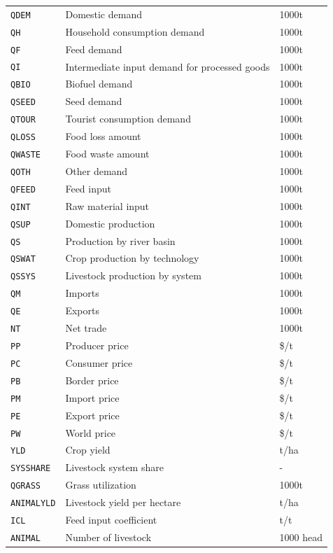 \begin{xltabular}{\linewidth}{l X l}
  \texttt{QDEM} & Domestic demand & 1000t \\
  \texttt{QH} & Household consumption demand & 1000t \\
  \texttt{QF} & Feed demand & 1000t \\
  \texttt{QI} & Intermediate input demand for processed goods & 1000t \\
  \texttt{QBIO} & Biofuel demand & 1000t \\
  \texttt{QSEED} & Seed demand & 1000t \\
  \texttt{QTOUR} & Tourist consumption demand & 1000t \\
  \texttt{QLOSS} & Food loss amount & 1000t \\
  \texttt{QWASTE} & Food waste amount & 1000t \\
  \texttt{QOTH} & Other demand & 1000t \\
  \texttt{QFEED} & Feed input & 1000t \\
  \texttt{QINT} & Raw material input & 1000t \\
  \texttt{QSUP} & Domestic production & 1000t \\
  \texttt{QS} & Production by river basin & 1000t \\
  \texttt{QSWAT} & Crop production by technology & 1000t \\
  \texttt{QSSYS} & Livestock production by system & 1000t \\
  \texttt{QM} & Imports & 1000t \\
  \texttt{QE} & Exports & 1000t \\
  \texttt{NT} & Net trade & 1000t \\
  \texttt{PP} & Producer price & \$/t \\
  \texttt{PC} & Consumer price & \$/t \\
  \texttt{PB} & Border price & \$/t \\
  \texttt{PM} & Import price & \$/t \\
  \texttt{PE} & Export price & \$/t \\
  \texttt{PW} & World price & \$/t \\
  \texttt{YLD} & Crop yield & t/ha \\
  \texttt{SYSSHARE} & Livestock system share & - \\
  \texttt{QGRASS} & Grass utilization & 1000t \\
  \texttt{ANIMALYLD} & Livestock yield per hectare & t/ha \\
  \texttt{ICL} & Feed input coefficient & t/t \\
  \texttt{ANIMAL} & Number of livestock & 1000 head \\

\end{xltabular}
